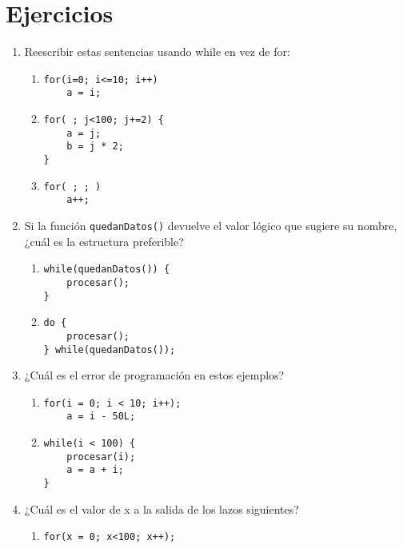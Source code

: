 
\section{Ejercicios}
\label{tc-control-ej}

\begin{enumerate}
\item Reescribir estas sentencias usando while en vez de for:
\begin{enumerate}[label=\alph*.]
	\item 
\begin{lstlisting}
for(i=0; i<=10; i++)
    a = i;
\end{lstlisting}

\item 
\begin{lstlisting}
for( ; j<100; j+=2) {
    a = j;
    b = j * 2;
}
\end{lstlisting}

\item 
\begin{lstlisting}
for( ; ; )
    a++;
\end{lstlisting}
\end{enumerate}

\item Si la función \lstinline{quedanDatos()} devuelve el valor lógico que sugiere su nombre,
¿cuál es la estructura preferible?
\begin{enumerate}[label=\alph*.]
\item 
\begin{lstlisting}
while(quedanDatos()) {
    procesar();
}
\end{lstlisting}

\item 
\begin{lstlisting}
do {
    procesar();
} while(quedanDatos());
\end{lstlisting}
\end{enumerate}
\item ¿Cuál es el error de programación en estos ejemplos?
	\begin{enumerate}[label=\alph*.]
\item 
\begin{lstlisting}
for(i = 0; i < 10; i++);
    a = i - 50L;
\end{lstlisting}

\item 
\begin{lstlisting}
while(i < 100) {
    procesar(i);
    a = a + i;
}
\end{lstlisting}
\end{enumerate}
\item ¿Cuál es el valor de x a la salida de los lazos siguientes?
	\begin{enumerate}[label=\alph*.]
	\item 
\begin{lstlisting}
for(x = 0; x<100; x++);
\end{lstlisting}


\end{enumerate}
\end{enumerate}
